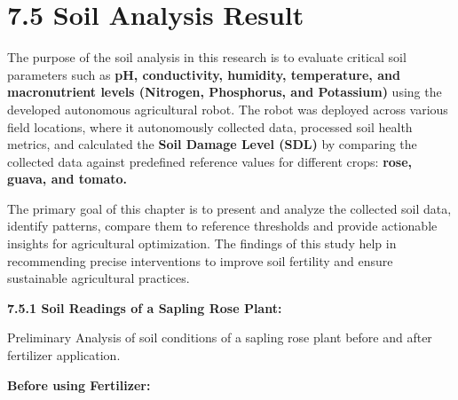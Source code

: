 \documentclass{book} %
\begin{document}
\noindent 

\noindent 

\noindent 

\noindent 

\noindent 
\section{7.5 Soil Analysis Result}

\noindent The purpose of the soil analysis in this research is to evaluate critical soil parameters such as \textbf{pH, conductivity, humidity, temperature, and macronutrient levels (Nitrogen, Phosphorus, and Potassium)} using the developed autonomous agricultural robot. The robot was deployed across various field locations, where it autonomously collected data, processed soil health metrics, and calculated the \textbf{Soil Damage Level (SDL)} by comparing the collected data against predefined reference values for different crops: \textbf{rose, guava, and tomato.}

\noindent The primary goal of this chapter is to present and analyze the collected soil data, identify patterns, compare them to reference thresholds and provide actionable insights for agricultural optimization. The findings of this study help in recommending precise interventions to improve soil fertility and ensure sustainable agricultural practices.

\noindent \textbf{}

\noindent \textbf{}

\noindent \textbf{}

\noindent \textbf{}

\noindent \textbf{}

\noindent \textbf{}

\noindent \textbf{}

\noindent \textbf{}

\noindent \textbf{}

\noindent \textbf{}

\noindent \textbf{}

\noindent \textbf{}

\noindent \textbf{7.5.1 Soil Readings of a Sapling Rose Plant:}

\noindent Preliminary Analysis of soil conditions of a sapling rose plant before and after fertilizer application.

\noindent \textbf{Before using Fertilizer:}

\noindent 
\end{document}
